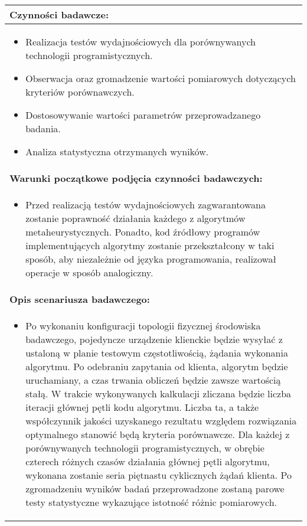 \begin{longtable}[c]{|llll|}
    \multicolumn{4}{|l|}{\textbf{Czynności badawcze:}}                               \\ \hline
    \multicolumn{4}{|p{\linewidth}|}{
        \begin{itemize}
            \item Realizacja testów wydajnościowych dla porównywanych technologii programistycznych.
            \item Obserwacja oraz gromadzenie wartości pomiarowych dotyczących kryteriów porównawczych.
            \item Dostosowywanie wartości parametrów przeprowadzanego badania.
            \item Analiza statystyczna otrzymanych wyników.
        \end{itemize}
    }                                                           \\ \hline
    \multicolumn{4}{|l|}{\textbf{Warunki początkowe podjęcia czynności badawczych:}} \\ \hline
    \multicolumn{4}{|p{\linewidth}|}{
        \begin{itemize}[label={}]
            \item Przed realizacją testów wydajnościowych zagwarantowana zostanie poprawność działania każdego z algorytmów metaheurystycznych. Ponadto, kod źródłowy programów implementujących algorytmy zostanie przekształcony w taki sposób, aby niezależnie od języka programowania, realizował operacje w sposób analogiczny. 
          \end{itemize}
    }                                                           \\ \hline
    \multicolumn{4}{|l|}{\textbf{Opis scenariusza badawczego:}}                      \\ \hline
    \multicolumn{4}{|p{\linewidth}|}{
        \begin{itemize}[label={}]
            \item Po wykonaniu konfiguracji topologii fizycznej środowiska badawczego, pojedyncze urządzenie klienckie będzie wysyłać z ustaloną w planie testowym częstotliwością, żądania wykonania algorytmu. Po odebraniu zapytania od klienta, algorytm będzie uruchamiany, a czas trwania obliczeń będzie zawsze wartością stałą. W trakcie wykonywanych kalkulacji zliczana będzie liczba iteracji głównej pętli kodu algorytmu. Liczba ta, a także współczynnik jakości uzyskanego rezultatu względem rozwiązania optymalnego stanowić będą kryteria porównawcze. Dla każdej z porównywanych technologii programistycznych, w obrębie czterech różnych czasów działania głównej pętli algorytmu, wykonana zostanie seria piętnastu cyklicznych żądań klienta. Po zgromadzeniu wyników badań przeprowadzone zostaną parowe testy statystyczne wykazujące istotność różnic pomiarowych.

\end{itemize}}
\end{longtable}
